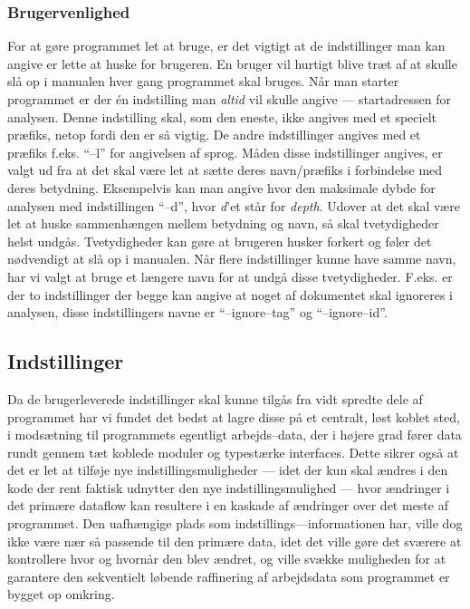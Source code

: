 \documentclass[a4paper,oneside]{memoir}
\begin{document}
\subsubsection{Brugervenlighed}
For at gøre programmet let at bruge, er det vigtigt at de
indstillinger man kan angive er lette at huske for brugeren. En bruger
vil hurtigt blive træt af at skulle slå op i manualen hver gang
programmet skal bruges. Når man starter programmet er der én
indstilling man \textit{altid} vil skulle angive --- startadressen for
analysen. Denne indstilling skal, som den eneste, ikke angives med et
specielt præfiks, netop fordi den er så vigtig. De andre indstillinger
angives med et præfiks f.eks. ``--l'' for angivelsen af sprog. Måden
disse indstillinger angives, er valgt ud fra at det skal være let at
sætte deres navn/præfiks i forbindelse med deres
betydning. Eksempelvis kan man angive hvor den maksimale dybde for
analysen med indstillingen ``--d'', hvor \textit{d}'et står for
\textit{depth}. Udover at det skal være let at huske sammenhængen mellem
betydning og navn, så skal tvetydigheder helst undgås. Tvetydigheder
kan gøre at brugeren husker forkert og føler det
nødvendigt at slå op i manualen. Når flere indstillinger kunne have
samme navn, har vi valgt at bruge et længere navn for at undgå
disse tvetydigheder. F.eks. er der to indstillinger der begge kan
angive at noget af dokumentet skal ignoreres i analysen, disse
indstillingers navne er ``--ignore--tag'' og ``--ignore--id''.

\subsection{Indstillinger}
Da de brugerleverede indstillinger skal kunne tilgås fra vidt spredte
dele af programmet har vi fundet det bedst at lagre disse på et
centralt, løst koblet sted, i modsætning til programmets egentligt
arbejds--data, der i højere grad fører data rundt gennem tæt koblede
moduler og typestærke interfaces. Dette sikrer også at det er let at
tilføje nye indstillingsmuligheder --- idet der kun skal ændres i den
kode der rent faktisk udnytter den nye indstillingsmulighed --- hvor
ændringer i det primære dataflow kan resultere i en kaskade af
ændringer over det meste af programmet.  Den uafhængige plads som
indstillings---informationen har, ville dog ikke være nær så passende
til den primære data, idet det ville gøre det sværere at kontrollere
hvor og hvornår den blev ændret, og ville svække muligheden for at
garantere den sekventielt løbende raffinering af arbejdsdata som
programmet er bygget op omkring.
\end{document}
